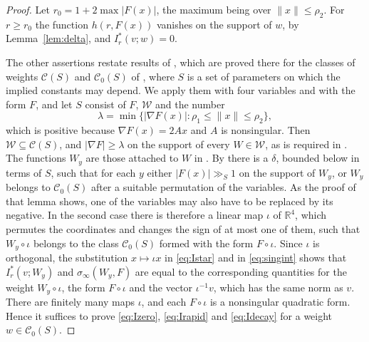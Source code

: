 \documentclass[11pt]{amsart}
\numberwithin{equation}{section}
\numberwithin{figure}{section}
\theoremstyle{definition}
\newcommand{\R}{\mathbb{R}}
\newcommand{\abs}[1]{\lvert #1\rvert}
\begin{document}
\begin{proof}
Let $r_0=1+2\max\abs{F(x)}$, the maximum being over
$\lVert x\rVert\le\rho_2$. For $r\ge r_0$ the function $h(r,F(x))$
vanishes on the support of $w$, by Lemma~\ref{lem:delta}, and
$I_r^*(v;w)=0$.

The other assertions restate results of \cite{HB}, which are proved
there for the classes of weights $\mathcal C(S)$ and $\mathcal C_0(S)$
of \cite[Sections~2 and~6]{HB}, where $S$ is a set of parameters on
which the implied constants may depend. We apply them with four
variables and with the form $F$, and let $S$ consist of $F$,
$\mathcal W$ and the number
\[
 \lambda=\min\{\abs{\nabla F(x)}:\rho_1\le\lVert x\rVert\le\rho_2\},
\]
which is positive because $\nabla F(x)=2Ax$ and $A$ is nonsingular.
Then $\mathcal W\subseteq\mathcal C(S)$, and $\abs{\nabla F}\ge\lambda$
on the support of every $W\in\mathcal W$, as is required in
\cite[Section~1]{HB}. The functions $W_y$ are those attached to $W$
in \cite[Lemma~2]{HB}. By \cite[Lemma~12]{HB} there is a $\delta$,
bounded below in terms of $S$, such that for each $y$ either
$\abs{F(x)}\gg_S1$ on the support of $W_y$, or $W_y$ belongs to
$\mathcal C_0(S)$ after a suitable permutation of the variables. As
the proof of that lemma shows, one of the variables may also have to
be replaced by its negative. In the second case there is therefore a
linear map $\iota$ of $\R^4$, which permutes the coordinates and
changes the sign of at most one of them, such that $W_y\circ\iota$
belongs to the class $\mathcal C_0(S)$ formed with the form
$F\circ\iota$. Since $\iota$ is orthogonal, the substitution
$x\mapsto\iota x$ in \eqref{eq:Istar} and in \eqref{eq:singint} shows
that $I_r^*(v;W_y)$ and $\sigma_\infty(W_y,F)$ are equal to the
corresponding quantities for the weight $W_y\circ\iota$, the form
$F\circ\iota$ and the vector $\iota^{-1}v$, which has the same norm
as $v$. There are finitely many maps $\iota$, and each $F\circ\iota$
is a nonsingular quadratic form. Hence it suffices to prove
\eqref{eq:Izero}, \eqref{eq:Irapid} and \eqref{eq:Idecay} for a
weight $w\in\mathcal C_0(S)$.


\end{proof}
\end{document}
